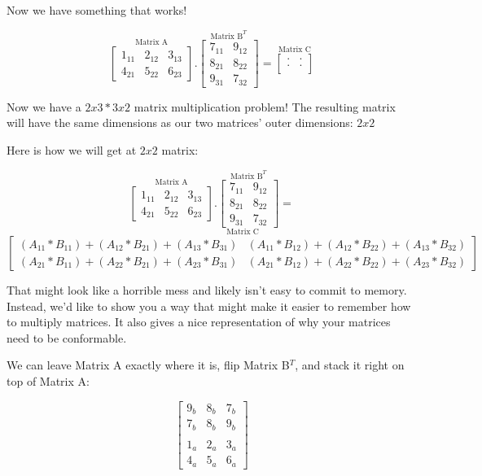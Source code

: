 \documentclass[
  letterpaper,
]{krantz}
\begin{document}
Now we have something that works!

\[
\stackrel{\mbox{Matrix A}}{
\begin{bmatrix}
1_{11} & 2_{12} & 3_{13}\\
4_{21} & 5_{22} & 6_{23}
\end{bmatrix}
}
.
\stackrel{\mbox{Matrix B}^T}{
\begin{bmatrix}
7_{11} & 9_{12} \\ 
8_{21}& 8_{22}\\
9_{31} & 7_{32}
\end{bmatrix} 
}
=
\stackrel{\mbox{Matrix C}}{
\begin{bmatrix}
. & . \\
. & . \\
\end{bmatrix}
}
\]

Now we have a \(2x3 * 3x2\) matrix multiplication problem! The resulting
matrix will have the same dimensions as our two matrices' outer
dimensions: \(2x2\)

Here is how we will get at \(2x2\) matrix:

\[
\stackrel{\mbox{Matrix A}}{
\begin{bmatrix}
1_{11} & 2_{12} & 3_{13}\\
4_{21} & 5_{22} & 6_{23}
\end{bmatrix}
}
.
\stackrel{\mbox{Matrix B}^T}{
\begin{bmatrix}
7_{11} & 9_{12} \\ 
8_{21}& 8_{22}\\
9_{31} & 7_{32}
\end{bmatrix} 
}
=
\] \[
\stackrel{\mbox{Matrix C}}{
\begin{bmatrix}
(A_{11}*B_{11})+(A_{12}*B_{21})+(A_{13}*B_{31}) & (A_{11}*B_{12})+(A_{12}*B_{22})+(A_{13}*B_{32}) \\
(A_{21}*B_{11})+(A_{22}*B_{21})+(A_{23}*B_{31}) & (A_{21}*B_{12})+(A_{22}*B_{22})+(A_{23}*B_{32})
\end{bmatrix} 
}
\]

That might look like a horrible mess and likely isn't easy to commit to
memory. Instead, we'd like to show you a way that might make it easier
to remember how to multiply matrices. It also gives a nice
representation of why your matrices need to be conformable.

We can leave Matrix A exactly where it is, flip Matrix B\(^T\), and
stack it right on top of Matrix A:

\[
\begin{bmatrix}
9_{b} & 8_{b} & 7_{b} \\
7_{b} & 8_{b} & 9_{b} \\
\\
1_{a} & 2_{a} & 3_{a} \\
4_{a} & 5_{a} & 6_{a}
\end{bmatrix}
\]
\end{document}
